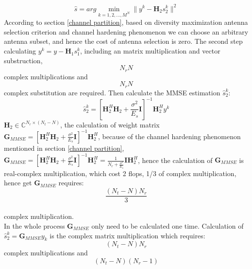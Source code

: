 \documentclass[12pt,a4paper,final]{article}
\begin{document}
\begin{spacing}{2.5}
\begin{equation}
\hat{s}=arg\min_{k=1,2,\ldots,M^{N}}\parallel y^{k}-\mathbf{H}_{2}s_{2}^{k} \parallel^{2}\label{equation6}
\end{equation}
According to section \ref{channel partition}, based on diversity maximization antenna selection criterion and channel hardening phenomenon we can choose an arbitrary antenna subset, and hence the cost of antenna selection is zero. 
The second step calculating $y^{k}=y-\mathbf{H}_{1}s_{1}^{k}$, including an matrix multiplication and vector substruction,
\begin{equation}
N_{r}N \label{cost11}
\end{equation}
complex multiplications and
\begin{equation}
 N_{r}N  \label{cost21}
\end{equation}
 complex substitution are required. Then calculate the MMSE estimation $\hat{s}_{2}^{k}$:
\begin{equation}
\hat{s}_{2}^{k}=[\mathbf{H}_{2}^{H}\mathbf{H}_{2}+\frac{\sigma^{2}}{E_{s}}\mathbf{I}]^{-1}\mathbf{H}_{2}^{H}y^{k}\label{equation7}
\end{equation}
$\mathbf{H}_{2}\in \mathbb{C}^{N_{r}\times (N_{t}-N)}$, the calculation of weight matrix $\mathbf{G}_{MMSE}=[\mathbf{H}_{2}^{H}\mathbf{H}_{2}+\frac{\sigma^{2}}{E_{s}}\mathbf{I}]^{-1}\mathbf{H}_{2}^{H}$, because of the channel hardening phenomenon mentioned in section \ref{channel partition}, $\mathbf{G}_{MMSE}=[\mathbf{H}_{2}^{H}\mathbf{H}_{2}+\frac{\sigma^{2}}{E_{s}}\mathbf{I}]^{-1}\mathbf{H}_{2}^{H}=\frac{1}{N_{r}+\frac{\sigma^{2}}{E_{s}}}\mathbf{I}\mathbf{H}_{2}^{H}$, hence the calculation of $\mathbf{G}_{MMSE}$ is real-complex multiplication, which cost 2 flops, 1/3 of complex multiplication, hence get $\mathbf{G}_{MMSE}$ requires:
\begin{equation}
\frac{(N_{t}-N)N_{r}}{3}    \label{cost31}
\end{equation}\\
complex multiplication.\\
In the whole process $\mathbf{G}_{MMSE}$ only need to be calculated one time. Calculation of $\hat{s}_{2}^{k}=\mathbf{G}_{MMSE}y_{k}$ is the complex matrix multiplication which requires:
\begin{equation}
 (N_{t}-N)N_{r} \label{cost12}
\end{equation}
 complex multiplications and 
 \begin{equation}
 (N_{t}-N)(N_{r}-1) \label{cost22}
 \end{equation}

\end{spacing}
\end{document}
